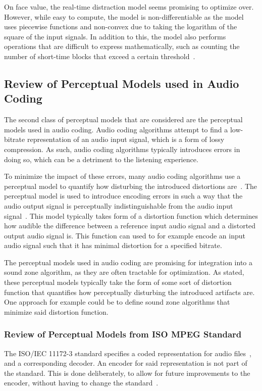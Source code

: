 On face value, the real-time distraction model seems promising to optimize over.
However, while easy to compute, the model is non-differentiable as the model uses
piecewise functions and non-convex due to taking the logarithm of the square of the input signals.
In addition to this, the model also performs operations that are difficult to express mathematically, such as counting 
the number of short-time blocks that exceed a certain threshold~\cite{ramo2017real}.

\subsection{Review of Perceptual Models used in Audio Coding}
\label{ch:perceptual:review:audio_coding}
The second class of perceptual models that are considered are the perceptual models used in audio coding.
Audio coding algorithms attempt to find a low-bitrate representation of an audio input signal, which is a 
form of lossy compression.
As such, audio coding algorithms typically introduces errors in doing so, 
which can be a detriment to the listening experience.

To minimize the impact of these errors, many audio coding algorithms use a perceptual model to quantify 
how disturbing the introduced distortions are~\cite{herre2019psychoacoustic}.
The perceptual model is used to introduce encoding errors in such a way that the audio output
signal is perceptually indistinguishable from the audio input signal~\cite{taal2012low}.
This model typically takes form of a distortion function which determines how
audible the difference between a reference input audio signal and a distorted output audio signal is.
This function can used to for example encode an input audio signal such that it has minimal distortion for a
specified bitrate.

The perceptual models used in audio coding are promising for integration into a sound zone algorithm, as they are 
often tractable for optimization.
As stated, these perceptual models typically take the form of some sort of distortion function that quantifies
how perceptually disturbing the introduced artifacts are. 
One approach for example could be to define sound zone algorithms that minimize said distortion function.

\subsubsection{Review of Perceptual Models from ISO MPEG Standard}
The ISO/IEC 11172-3 standard specifies a coded representation for audio files~\cite{ISO11172-3}, 
and a corresponding decoder.
An encoder for said representation is not part of the standard.
This is done deliberately, to allow for future improvements to the encoder, 
without having to change the standard~\cite{pan1995tutorial}.

